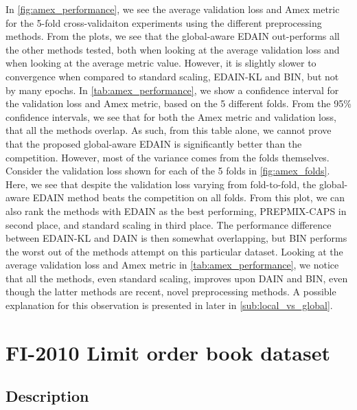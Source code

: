 \documentclass{statsmsc}
\begin{document}
{In \cref{fig:amex_performance}, we see the average validation loss and Amex metric for the
5-fold cross-validaiton experiments using the different preprocessing methods. From the plots,
we see that the global-aware \ac{EDAIN} out-performs all the other methods tested, both
when looking at the average validation loss and when looking at the average metric value.
However, it is slightly slower to convergence when compared to standard scaling,
\ac{EDAIN-KL} and \ac{BIN}, but not by many epochs.
In \cref{tab:amex_performance}, we show a confidence interval for the validation loss and Amex
metric, based on the 5 different folds. From the 95\% confidence intervals, we see that for both
the Amex metric and validation loss, that all the methods overlap. As such, from this table
alone, we cannot prove that the proposed global-aware \ac{EDAIN} is significantly better than
the competition. However, most of the variance comes from the folds themselves. Consider the
validation loss shown for each of the 5 folds in \cref{fig:amex_folds}. Here, we see that despite
the validation loss varying from fold-to-fold, the global-aware \ac{EDAIN} method beats the
competition on all folds. From this plot, we can also rank the methods with \ac{EDAIN} as the
best performing, \ac{PREPMIX-CAPS} in second place, and standard scaling in third place.
The performance difference between \ac{EDAIN-KL} and \ac{DAIN} is then somewhat overlapping,
but \ac{BIN} performs the worst out of the methods attempt on this particular dataset.
Looking at the average validation loss and Amex metric in \cref{tab:amex_performance}, we notice
that all the methods, even standard scaling, improves upon \ac{DAIN} and \ac{BIN}, even though
the latter methods are recent, novel preprocessing methods. A possible explanation for this
observation is presented in later in \cref{sub:local_vs_global}.



\section{FI-2010 Limit order book dataset}%
\label{sec:American Express default prediction dataset}%

\subsection{Description}%
\label{sub:Description}

}
\end{document}
